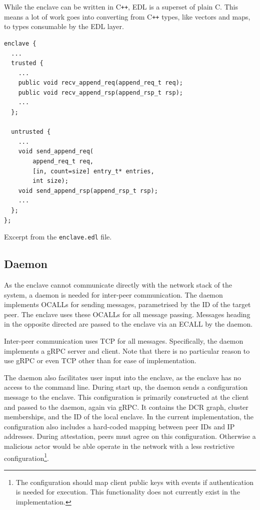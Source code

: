 \documentclass{article}
\newcommand\cpp{C\texttt{++}\xspace}
\begin{document}
	While the enclave can be written in \cpp, EDL is a superset of plain C.
	This means a lot of work goes into converting from \cpp types, like vectors and maps, to types consumable by the EDL layer.

	\begin{snippet}
		\begin{mdframed}[backgroundcolor=Papyrus]
			\begin{lstlisting}[basicstyle=\small\ttfamily]
enclave {
  ...
  trusted {
    ...
    public void recv_append_req(append_req_t req);
    public void recv_append_rsp(append_rsp_t rsp);
    ...
  };

  untrusted {
    ...
    void send_append_req(
    	append_req_t req,
    	[in, count=size] entry_t* entries,
    	int size);
    void send_append_rsp(append_rsp_t rsp);
    ...
  };
};
			\end{lstlisting}
		\end{mdframed}
		\caption{Excerpt from the \texttt{enclave.edl} file.}
		\label{listing:edl}
	\end{snippet}

	\subsection{Daemon}

	As the enclave cannot communicate directly with the network stack of the system, a daemon is needed for inter-peer communication.
	The daemon implements OCALLs for sending messages, parametrised by the ID of the target peer.
	The enclave uses these OCALLs for all message passing.
	Messages heading in the opposite directed are passed to the enclave via an ECALL by the daemon.

	Inter-peer communication uses TCP for all messages.
	Specifically, the daemon implements a gRPC server and client.
	Note that there is no particular reason to use gRPC or even TCP other than for ease of implementation.

	The daemon also facilitates user input into the enclave, as the enclave has no access to the command line.
	During start up, the daemon sends a configuration message to the enclave.
	This configuration is primarily constructed at the client and passed to the daemon, again via gRPC.
	It contains the DCR graph, cluster memberships, and the ID of the local enclave.
	In the current implementation, the configuration also includes a hard-coded mapping between peer IDs and IP addresses.
	During attestation, peers must agree on this configuration.
	Otherwise a malicious actor would be able operate in the network with a less restrictive configuration\footnote{The configuration should map client public keys with events if authentication is needed for execution. This functionality does not currently exist in the implementation.}.
\end{document}
